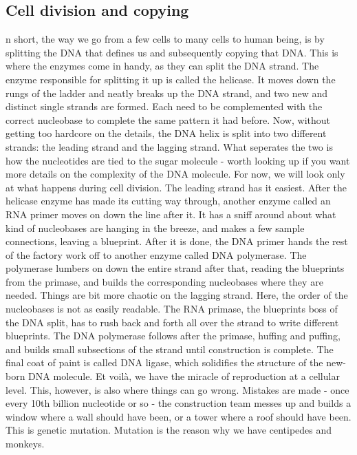 \subsection{Cell division and copying}
n short, the way we go from a few cells to many cells to human being, is by splitting the DNA that defines us and subsequently copying that DNA.
This is where the enzymes come in handy, as they can split the DNA strand.
The enzyme responsible for splitting it up is called the helicase.
It moves down the rungs of the ladder and neatly breaks up the DNA strand, and two new and distinct single strands are formed.
Each need to be complemented with the correct nucleobase to complete the same pattern it had before.
Now, without getting too hardcore on the details, the DNA helix is split into two different strands: the leading strand and the lagging strand.
What seperates the two is how the nucleotides are tied to the sugar molecule - worth looking up if you want more details on the complexity of the DNA molecule.
For now, we will look only at what happens during cell division.
The leading strand has it easiest.
After the helicase enzyme has made its cutting way through, another enzyme called an RNA primer moves on down the line after it.
It has a sniff around about what kind of nucleobases are hanging in the breeze, and makes a few sample connections, leaving a blueprint.
After it is done, the DNA primer hands the rest of the factory work off to another enzyme called DNA polymerase.
The polymerase lumbers on down the entire strand after that, reading the blueprints from the primase, and builds the corresponding nucleobases where they are needed. 
Things are bit more chaotic on the lagging strand.
Here, the order of the nucleobases is not as easily readable.
The RNA primase, the blueprints boss of the DNA split, has to rush back and forth all over the strand to write different blueprints.
The DNA polymerase follows after the primase, huffing and puffing, and builds small subsections of the strand until construction is complete.
The final coat of paint is called DNA ligase, which solidifies the structure of the new-born DNA molecule.
Et voilà, we have the miracle of reproduction at a cellular level.
This, however, is also where things can go wrong.
Mistakes are made - once every 10th billion nucleotide or so - the construction team messes up and builds a window where a wall should have been, or a tower where a roof should have been.
This is genetic mutation.
Mutation is the reason why we have centipedes and monkeys.
